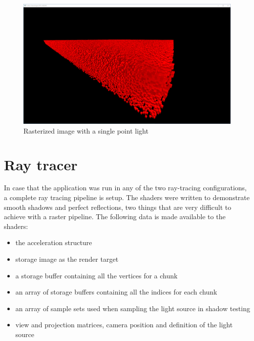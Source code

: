 \documentclass[times, utf8, zavrsni, numeric]{fer}
\begin{document}
\begin{center}
\begin{figure}[H]
\includegraphics[width=1\textwidth]{raster.png}
\caption{Rasterized image with a single point light}
\end{figure}
\end{center}

\section{Ray tracer}
In case that the application was run in any of the two ray-tracing configurations, a complete ray tracing pipeline is setup. The shaders were written to demonstrate smooth shadows and perfect reflections, two things that are very difficult to achieve with a raster pipeline. The following data is made available to the shaders:
\begin{itemize}
\item{the acceleration structure}
\item{storage image as the render target}
\item{a storage buffer containing all the vertices for a chunk}
\item{an array of storage buffers containing all the indices for each chunk}
\item{an array of sample sets used when sampling the light source in shadow testing}
\item{view and projection matrices, camera position and definition of the light source}
\end{itemize}
\end{document}
